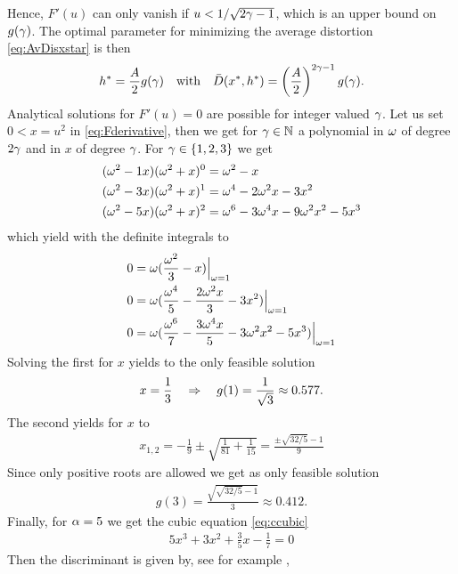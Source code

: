 \documentclass[smallabstract,smallcaptions]{dccpaper}
\newcounter{example}[section]
\newcommand{\Dis}{\ensuremath{D}}                    %
\newcommand{\AvDis}{\ensuremath{\bar{\Dis}}}         %
\begin{document}
  Hence, $F'(u)$ can only vanish if $u<1/\sqrt{2\gamma-1}$, which is an upper bound on $g(\gamma)$.
  The optimal parameter for minimizing the average distortion  \eqref{eq:AvDisxstar} is then 
  \begin{align}
    h^*= \frac{A}{2} g(\gam) \quad\text{with}\quad \AvDis(x^*,h^*)= \left(\frac{A}{2}\right)^{2\gam-1} g(\gam).
  \end{align}
  Analytical solutions for $F'(u)=0$ are possible for integer valued $\gamma$. 
  Let us set $0<x=u^2$ in \eqref{eq:Fderivative}, then we get for $\gamma\in{\ensuremath{\mathbb N}}$ a polynomial in $\omega$ of degree $2\gamma$ and in
  $x$ of degree $\gamma$. For $\gamma\in\{1,2,3\}$ we get 
%
\begin{align}
  (\omega^2-1x)(\omega^2+x)^0 &=\omega^2-x\\
  (\omega^2-3x)(\omega^2+x)^1 &=\omega^4 -2\omega^2x -3x^2 \\
  (\omega^2-5x)(\omega^2+x)^2 &=\omega^6 -3\omega^4x -9\omega^2x^2-5x^3
\end{align}
%
which yield with the definite integrals to
%
\begin{align}
  0 &= \omega(\frac{\omega^2}{3}-x)\Big|_{\omega=1}\\
  0 &= \omega(\frac{\omega^4}{5} -\frac{2\omega^2x}{3} - 3x^2)\Big|_{\omega=1}\\ 
  0 &= \omega(\frac{\omega^6}{7} -\frac{3\omega^4x}{5} - 3\omega^2x^2 -5x^3)\Big|_{\omega=1}\label{eq:ccubic} 
\end{align}
%
Solving the first for $x$  yields to the only feasible solution
%
\begin{align}
  x=\frac{1}{3} \quad\Rightarrow\quad g(1)=\frac{1}{\sqrt{3}}\approx 0.577.
\end{align}
%
The second yields for $x$ to 
%
\begin{align}
  x_{1,2}= -\frac{1}{9} \pm \sqrt{\frac{1}{81}+\frac{1}{15}} = \frac{\pm \sqrt{32/5} -1}{9}
\end{align}
%
Since only positive roots are allowed we get as only feasible solution
%
\begin{align}
  g(3)=\frac{\sqrt{\sqrt{32/5}-1}}{3}\approx 0.412.
\end{align}
%
Finally, for  $\alpha=5$ we get the cubic equation \eqref{eq:ccubic}
%
\begin{align}
  5x^3 + 3 x^2 + \frac{3}{5} x - \frac{1}{7}=0
\end{align}
%
Then the discriminant is given by, see for example \cite[2.3.2]{Zwi03},
\end{document}
